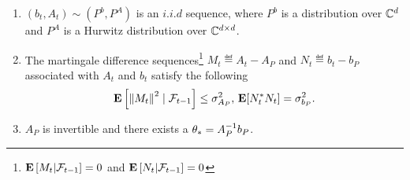\begin{assumption}\label{assmp:lsa}
\begin{enumerate}[leftmargin=*, before = \leavevmode\vspace{-\baselineskip}]
\item \label{dist} $(b_t, A_t)\sim (P^b,P^A)$ is an $i.i.d$ sequence, where $P^b$ is a distribution over $\mathbb{C}^d$ and $P^A$ is a Hurwitz distribution over $\mathbb{C}^{d \times d}$.
\item \label{matvar} The martingale difference sequences\footnote{$\mathbf{E}\left[M_t|\mathcal{F}_{t-1}\right]=0$ and $\mathbf{E}\left[N_t|\mathcal{F}_{t-1}\right]=0$} $M_t\eqdef A_t-A_{P}$ and $N_t\eqdef b_t-b_{P}$ associated with $A_t$ and $b_t$ satisfy the following
\begin{align*}\mathbf{E}\left[ \left\| M_t\right\|^2\mid\mathcal{F}_{t-1}\right]\leq \sigma^2_{A_P}, \, \mathbf{E}[N_t^* N_t]=\sigma^2_{b_P}.\end{align*}
\item $A_P$ is invertible and there exists a $\theta_*=A^{-1}_Pb_P$.
\end{enumerate}
\end{assumption}
